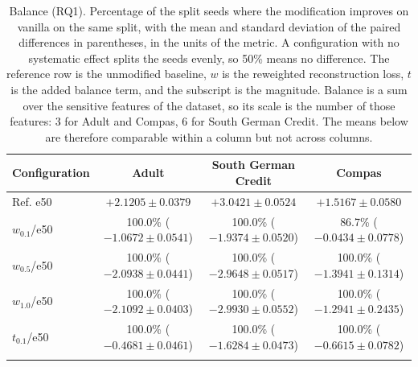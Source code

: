 
\begin{table}[t]
\centering
\small
\caption{Balance (RQ1). Percentage of the split seeds where the modification improves on vanilla on the same split, with the mean and standard deviation of the paired differences in parentheses, in the units of the metric. A configuration with no systematic effect splits the seeds evenly, so 50\% means no difference. The reference row is the unmodified baseline, $w$ is the reweighted reconstruction loss, $t$ is the added balance term, and the subscript is the magnitude. Balance is a sum over the sensitive features of the dataset, so its scale is the number of those features: 3 for Adult and Compas, 6 for South German Credit. The means below are therefore comparable within a column but not across columns.}
\label{tab:stats-balance}
\begin{tabular}{p{1.5cm}ccc}
\toprule
Configuration & Adult & South German Credit & Compas \\
\midrule
Ref. e50 & $+2.1205 \pm 0.0379$ & $+3.0421 \pm 0.0524$ & $+1.5167 \pm 0.0580$ \\ \hline
$w_{0.1}$/e50 & \makecell{100.0\% \\ ($-1.0672 \pm 0.0541$)} & \makecell{100.0\% \\ ($-1.9374 \pm 0.0520$)} & \makecell{86.7\% \\ ($-0.0434 \pm 0.0778$)} \\ \hdashline
$w_{0.5}$/e50 & \makecell{100.0\% \\ ($-2.0938 \pm 0.0441$)} & \makecell{100.0\% \\ ($-2.9648 \pm 0.0517$)} & \makecell{100.0\% \\ ($-1.3941 \pm 0.1314$)} \\ \hdashline
$w_{1.0}$/e50 & \makecell{100.0\% \\ ($-2.1092 \pm 0.0403$)} & \makecell{100.0\% \\ ($-2.9930 \pm 0.0552$)} & \makecell{100.0\% \\ ($-1.2941 \pm 0.2435$)} \\ \hdashline
$t_{0.1}$/e50 & \makecell{100.0\% \\ ($-0.4681 \pm 0.0461$)} & \makecell{100.0\% \\ ($-1.6284 \pm 0.0473$)} & \makecell{100.0\% \\ ($-0.6615 \pm 0.0782$)} \\ \hdashline

\end{tabular}
\end{table}
